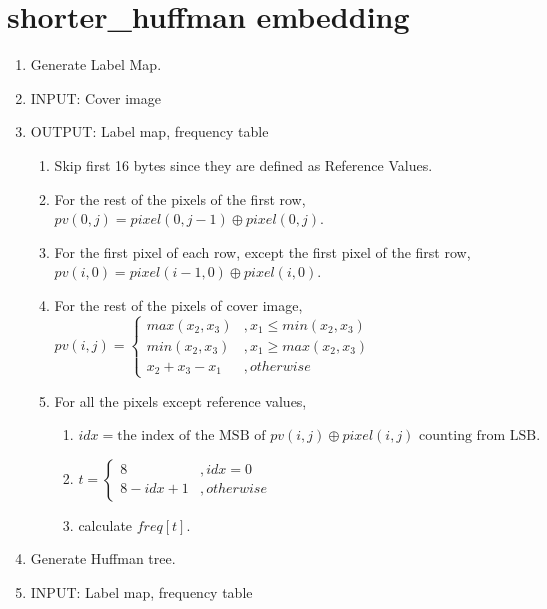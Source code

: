 \documentclass{article}
\begin{document}
\section{shorter\_huffman embedding}
\begin{enumerate}
	\item Generate Label Map.
	\item[] INPUT: Cover image
	\item[] OUTPUT: Label map, frequency table
	      \begin{enumerate}
		      \item Skip first 16 bytes since they are defined as Reference Values.
		      \item For the rest of the pixels of the first row, $pv(0, j) = pixel(0, j - 1) \oplus pixel(0, j). $
		      \item For the first pixel of each row, except the first pixel of the first row, $pv(i, 0) = pixel(i - 1, 0) \oplus pixel(i, 0). $
		      \item For the rest of the pixels of cover image, 	$pv(i, j) = \left\{
			            \begin{array}{rl}
				            max(x_2, x_3)   & , x_1 \leq min(x_2, x_3) \\
				            min(x_2, x_3)   & , x_1 \geq max(x_2, x_3) \\
				            x_2 + x_3 - x_1 & , otherwise
			            \end{array} \right. $
		      \item For all the pixels except reference values,
		            \begin{enumerate}
			            \item $idx = \textrm{the index of the MSB of } pv(i, j) \oplus pixel(i, j) \textrm{ counting from LSB.}$
			            \item 
			                  $t = \left\{
				                  \begin{array}{rl}
					                  8           & , idx = 0   \\
					                  8 - idx + 1 & , otherwise
				                  \end{array} \right.$
			            \item calculate $freq[t]$.
		            \end{enumerate}
	      \end{enumerate}
	\item Generate Huffman tree.
	\item[] INPUT: Label map, frequency table

\end{enumerate}
\end{document}
